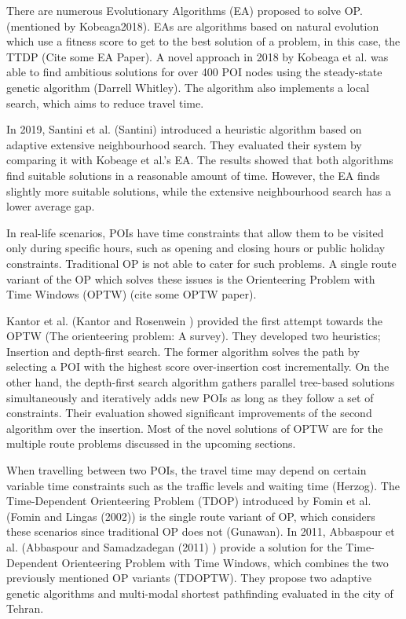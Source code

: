 There are numerous Evolutionary Algorithms (EA) proposed to solve OP.
(mentioned by Kobeaga2018). EAs are algorithms based on natural evolution which
use a fitness score to get to the best solution of a problem, in this case, the
TTDP (Cite some EA Paper). A novel approach in 2018  by Kobeaga et al. was able
to find ambitious solutions for over 400 POI nodes using the steady-state
genetic algorithm (Darrell Whitley). The algorithm also implements a local
search, which aims to reduce travel time. 

In 2019, Santini et al. (Santini) introduced a heuristic algorithm based on
adaptive extensive neighbourhood search. They evaluated their system by
comparing it with Kobeage et al.'s EA. The results showed that both algorithms
find suitable solutions in a reasonable amount of time. However, the EA finds
slightly more suitable solutions, while the extensive neighbourhood search has
a lower average gap.

In real-life scenarios, POIs have time constraints that allow them to be
visited only during specific hours, such as opening and closing hours or public
holiday constraints. Traditional OP is not able to cater for such problems. A
single route variant of the OP which solves these issues is the Orienteering
Problem with Time Windows (OPTW) (cite some OPTW paper). 

Kantor et al. (Kantor and Rosenwein ) provided the first attempt towards the
OPTW (The orienteering problem: A survey). They developed two heuristics;
Insertion and depth-first search. The former algorithm solves the path by
selecting a POI with the highest score over-insertion cost incrementally. On
the other hand, the depth-first search algorithm gathers parallel tree-based
solutions simultaneously and iteratively adds new POIs as long as they follow a
set of constraints. Their evaluation showed significant improvements of the
second algorithm over the insertion. Most of the novel solutions of OPTW are
for the multiple route problems discussed in the upcoming sections. 

When travelling between two POIs, the travel time may depend on certain
variable time constraints such as the traffic levels and waiting time (Herzog).
The Time-Dependent Orienteering Problem (TDOP) introduced by Fomin et al.
(Fomin and Lingas (2002)) is the single route variant of OP, which considers
these scenarios since traditional OP does not (Gunawan). In 2011, Abbaspour et
al. (Abbaspour and Samadzadegan (2011) ) provide a solution for the
Time-Dependent Orienteering Problem with Time Windows, which combines the two
previously mentioned OP variants (TDOPTW).  They propose two adaptive genetic
algorithms and multi-modal shortest pathfinding evaluated in the city of
Tehran.

